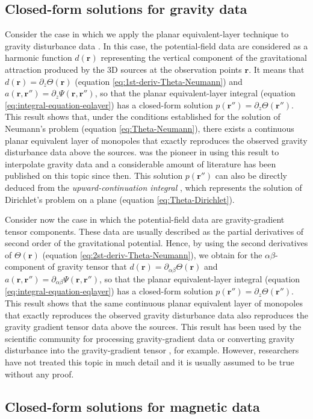 \subsection{Closed-form solutions for gravity data}
\label{subsec:solutions_gravity_data}

Consider the case in which we apply the planar equivalent-layer technique to 
gravity disturbance data \cite[e.g.,][ p. 93]{hofmann-wellenhof-moritz2005}. 
In this case, the potential-field
data are considered as a harmonic function $d(\mathbf{r})$ representing the vertical 
component of the gravitational attraction produced by the 3D sources at the observation
points $\mathbf{r}$. It means that $d(\mathbf{r}) = \partial_{z} \Theta(\mathbf{r})$
(equation \ref{eq:1st-deriv-Theta-Neumann}) and 
$a(\mathbf{r}, \mathbf{r}'') = \partial_{z} \Psi(\mathbf{r}, \mathbf{r}'')$, so that 
the planar equivalent-layer integral (equation \ref{eq:integral-equation-eqlayer}) has
a closed-form solution $p(\mathbf{r}'') = \partial_{z} \Theta(\mathbf{r}'')$.
This result shows that, under the conditions established for the solution of 
Neumann's problem (equation \ref{eq:Theta-Neumann}), there exists a continuous planar
equivalent layer of monopoles that exactly reproduces the observed gravity disturbance
data above the sources.
\citet{dampney1969} was the pioneer in using this result to interpolate gravity data and
a considerable amount of literature has been published on this topic since then.
This solution $p(\mathbf{r}'')$ can also be directly deduced from the
\textit{upward-continuation integral}
\citep[e.g., ][]{peters1949, roy1962, bhattacharyya1967, henderson1970, gunn1975}, 
which represents the solution of Dirichlet’s problem on a plane
(equation \ref{eq:Theta-Dirichlet}).

Consider now the case in which the potential-field data are gravity-gradient tensor 
components. These data are usually described as the partial derivatives of second order 
of the gravitational potential. Hence, by using the second derivatives of 
$\Theta(\mathbf{r})$ (equation \ref{eq:2st-deriv-Theta-Neumann}), we obtain for the 
$\alpha\beta$-component of gravity tensor that
$d(\mathbf{r}) = \partial_{\alpha\beta} \Theta(\mathbf{r})$ and 
$a(\mathbf{r}, \mathbf{r}'') = \partial_{\alpha\beta} \Psi(\mathbf{r}, \mathbf{r}'')$, 
so that the planar equivalent-layer integral 
(equation \ref{eq:integral-equation-eqlayer}) has a closed-form solution 
$p(\mathbf{r}'') = \partial_{z} \Theta(\mathbf{r}'')$.
This result shows that the same continuous planar equivalent layer of monopoles that 
exactly reproduces the observed gravity disturbance data also reproduces the 
gravity gradient tensor data above the sources.
This result has been used by the scientific community for processing gravity-gradient
data \citep{barnes-lumley_2011} or converting gravity disturbance into the
gravity-gradient tensor \citep{piauilino_etal2019_seg, li_etal2021}, for example.
However, researchers have not treated this topic in much detail and it is usually assumed
to be true without any proof.

\subsection{Closed-form solutions for magnetic data}
\label{subsec:solutions_magnetic_data}